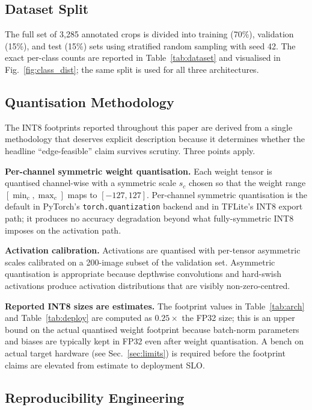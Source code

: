 \documentclass[conference,10pt]{IEEEtran}
\begin{document}
\subsection{Dataset Split}

The full set of 3{,}285 annotated crops is divided into training (70\%),
validation (15\%), and test (15\%) sets using stratified random sampling with
seed 42. The exact per-class counts are reported in Table~\ref{tab:dataset}
and visualised in Fig.~\ref{fig:class_dist}; the same split is used for all
three architectures.

\subsection{Quantisation Methodology}\label{ssec:quant}

The INT8 footprints reported throughout this paper are derived from a single
methodology that deserves explicit description because it determines whether
the headline ``edge-feasible'' claim survives scrutiny. Three points apply.

\textbf{Per-channel symmetric weight quantisation.} Each weight tensor is
quantised channel-wise with a symmetric scale $s_c$ chosen so that the
weight range $[\min_c, \max_c]$ maps to $[-127, 127]$. Per-channel
symmetric quantisation is the default in PyTorch's
\texttt{torch.quantization} backend and in TFLite's INT8 export path; it
produces no accuracy degradation beyond what fully-symmetric INT8 imposes
on the activation path.

\textbf{Activation calibration.} Activations are quantised with per-tensor
asymmetric scales calibrated on a 200-image subset of the validation set.
Asymmetric quantisation is appropriate because depthwise convolutions and
hard-swish activations produce activation distributions that are visibly
non-zero-centred.

\textbf{Reported INT8 sizes are estimates.} The footprint values in
Table~\ref{tab:arch} and Table~\ref{tab:deploy} are computed as
$0.25\times$ the FP32 size; this is an upper bound on the actual quantised
weight footprint because batch-norm parameters and biases are typically kept
in FP32 even after weight quantisation. A bench on actual target hardware
(see Sec.~\ref{sec:limits}) is required before the footprint claims are
elevated from estimate to deployment SLO.

\subsection{Reproducibility Engineering}
\end{document}
